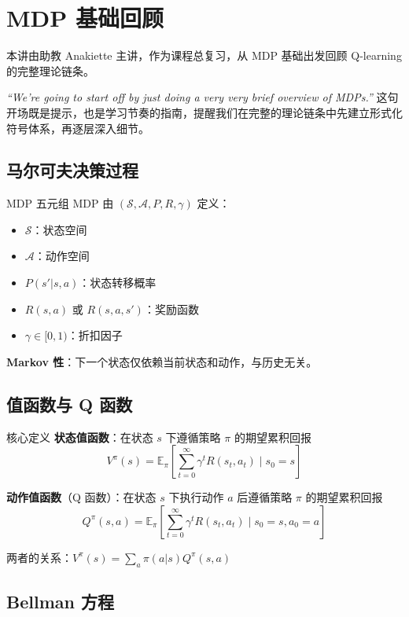 \section{MDP 基础回顾}

本讲由助教 Anakiette 主讲，作为课程总复习，从 MDP 基础出发回顾 Q-learning 的完整理论链条。

\textit{``We're going to start off by just doing a very very brief overview of MDPs.''} 这句开场既是提示，也是学习节奏的指南，提醒我们在完整的理论链条中先建立形式化符号体系，再逐层深入细节。

\subsection{马尔可夫决策过程}

\begin{importantbox}{MDP 五元组}
MDP 由 $(\mathcal{S}, \mathcal{A}, P, R, \gamma)$ 定义：
\begin{itemize}
    \item $\mathcal{S}$：状态空间
    \item $\mathcal{A}$：动作空间
    \item $P(s' | s, a)$：状态转移概率
    \item $R(s, a)$ 或 $R(s, a, s')$：奖励函数
    \item $\gamma \in [0, 1)$：折扣因子
\end{itemize}
\textbf{Markov 性}：下一个状态仅依赖当前状态和动作，与历史无关。
\end{importantbox}

\subsection{值函数与 Q 函数}

\begin{importantbox}{核心定义}
\textbf{状态值函数}：在状态 $s$ 下遵循策略 $\pi$ 的期望累积回报
$$V^\pi(s) = \mathbb{E}_\pi\left[\sum_{t=0}^{\infty} \gamma^t R(s_t, a_t) \mid s_0 = s\right]$$

\textbf{动作值函数}（Q 函数）：在状态 $s$ 下执行动作 $a$ 后遵循策略 $\pi$ 的期望累积回报
$$Q^\pi(s, a) = \mathbb{E}_\pi\left[\sum_{t=0}^{\infty} \gamma^t R(s_t, a_t) \mid s_0 = s, a_0 = a\right]$$

两者的关系：$V^\pi(s) = \sum_a \pi(a|s) Q^\pi(s, a)$
\end{importantbox}

\subsection{Bellman 方程}

